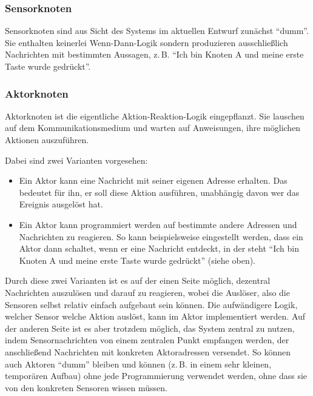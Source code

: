 \documentclass{IEEEtran}
\begin{document}
        \subsubsection{Sensorknoten}\label{Sensorknoten}
            Sensorknoten sind aus Sicht des Systems im aktuellen Entwurf
            zunächst \enquote{dumm}. Sie enthalten keinerlei Wenn-Dann-Logik
            sondern produzieren ausschließlich Nachrichten mit bestimmten
            Aussagen, z.\,B. \enquote{Ich bin Knoten A und meine erste Taste
            wurde gedrückt}.
        \subsubsection{Aktorknoten}\label{Aktorknoten}
            Aktorknoten ist die eigentliche Aktion-Reaktion-Logik eingepflanzt.
            Sie lauschen auf dem Kommunikationsmedium und warten auf Anweisungen,
            ihre möglichen Aktionen auszuführen.

            Dabei sind zwei Varianten vorgesehen:
            \begin{itemize}
                \item Ein Aktor kann eine Nachricht mit seiner eigenen Adresse
                    erhalten. Das bedeutet für ihn, er soll diese Aktion
                    ausführen, unabhängig davon wer das Ereignis ausgelöst hat.
                \item Ein Aktor kann programmiert werden auf bestimmte andere
                    Adressen und Nachrichten zu reagieren.
                    So kann beispielsweise eingestellt werden, dass ein Aktor
                    dann schaltet, wenn er eine Nachricht entdeckt, in der steht
                    \enquote{Ich bin Knoten A und meine erste Taste
                    wurde gedrückt} (siehe oben).
            \end{itemize}

            Durch diese zwei Varianten ist es auf der einen Seite möglich,
            dezentral Nachrichten auszulösen und darauf zu reagieren, wobei
            die Auslöser, also die Sensoren selbst relativ einfach aufgebaut
            sein können. Die aufwändigere Logik, welcher Sensor welche Aktion
            auslöst, kann im Aktor implementiert werden.
            Auf der anderen Seite ist es aber trotzdem möglich, das System
            zentral zu nutzen, indem Sensornachrichten von einem zentralen
            Punkt empfangen werden, der anschließend Nachrichten mit konkreten
            Aktoradressen versendet. So können auch Aktoren \enquote{dumm}
            bleiben und können (z.\,B. in einem sehr kleinen, temporären Aufbau)
            ohne jede Programmierung verwendet werden, ohne dass sie von den
            konkreten Sensoren wissen müssen.
\end{document}
